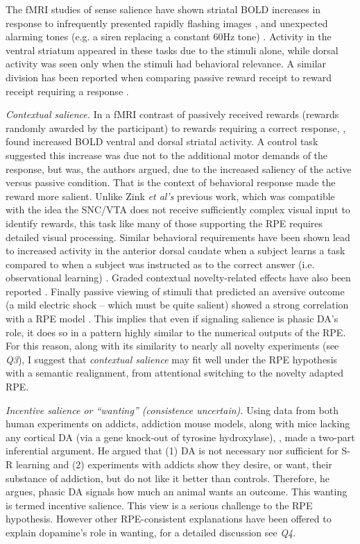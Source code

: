 \documentclass[doc]{apa}        %
\begin{document}
The fMRI studies of sense salience have shown striatal BOLD increases in response to infrequently presented rapidly flashing images \cite{Zink:2003p5107}, and unexpected alarming tones (e.g. a siren replacing a constant 60Hz tone) \cite{Zink:2006p7210}.  Activity in the ventral striatum appeared in these tasks due to the stimuli alone, while dorsal activity was seen only when the stimuli had behavioral relevance.  A similar division has been reported when comparing passive reward receipt to reward receipt requiring a response \cite{ODoherty:2006p2875}.  

\emph{Contextual salience.}
In a fMRI contrast of passively received rewards (rewards randomly awarded by the participant) to rewards requiring a correct response, \cite{Zink:2004p5108}, found increased BOLD ventral and dorsal striatal activity.  A control task suggested this increase was due not to the additional motor demands of the response, but was, the authors argued, due to the increased saliency of the active versus passive condition.  That is the context of behavioral response made the reward more salient. Unlike Zink \emph{et al's} previous work, which was compatible with the idea the SNC/VTA does not receive sufficiently complex visual input to identify rewards, this task like many of those supporting the RPE requires detailed visual processing.  Similar behavioral requirements have been shown lead to increased activity in the anterior dorsal caudate when a subject learns a task compared to when a subject was instructed as to the correct answer (i.e. observational learning) \cite{Cincotta:2007p6672}.  Graded contextual novelty-related effects have also been reported \cite{GuitartMasip:2010p7227}.  Finally passive viewing of stimuli that predicted an aversive outcome (a mild electric shock -- which must be quite salient) showed a strong correlation with a RPE model \cite{seymour:2004aa}.  This implies that even if signaling salience is phasic DA's role, it does so in a pattern highly similar to the numerical outputs of the RPE.  For this reason, along with its similarity to nearly all novelty experiments (see \emph{Q3}), I suggest that \emph{contextual salience} may fit well under the RPE hypothesis with a semantic realignment, from attentional switching to the novelty adapted RPE.

\emph{Incentive salience or ``wanting'' (consistence uncertain).}
Using data from both human experiments on addicts, addiction mouse models, along with mice lacking any cortical DA (via a gene knock-out of tyrosine hydroxylase), , made a two-part inferential argument. He argued that (1) DA is not necessary nor sufficient for S-R learning and (2) experiments with addicts show they desire, or want, their substance of addiction, but do not like it better than controls. Therefore, he argues, phasic DA signals how much an animal wants an outcome.  This wanting is termed incentive salience.  This view is a serious challenge to the RPE hypothesis.  However other RPE-consistent explanations have been offered to explain dopamine's role in wanting, for a detailed discussion see \emph{Q4}.
\end{document}
